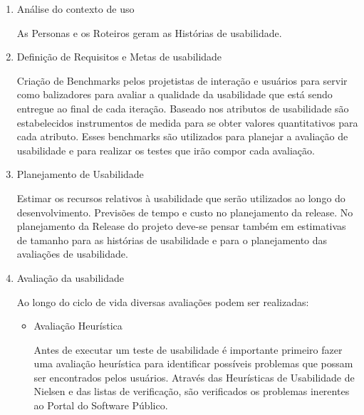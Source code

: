 \begin{enumerate}
\begin{itemize}
	\end{itemize}
			
		
\item Análise do contexto de uso

		As Personas e os Roteiros geram as Histórias de usabilidade.

\item Definição de Requisitos e Metas de usabilidade

	Criação de Benchmarks pelos projetistas de interação e usuários para servir como balizadores para avaliar a qualidade da usabilidade que está sendo entregue ao final de cada iteração.
	Baseado nos atributos de usabilidade são estabelecidos instrumentos de medida para se obter valores quantitativos 	para cada atributo.
	Esses benchmarks são utilizados para planejar a avaliação de usabilidade e para realizar os testes que irão compor cada avaliação. %
	
		
\item Planejamento de Usabilidade

	Estimar os recursos relativos à usabilidade que serão utilizados ao longo do desenvolvimento. Previsões de tempo e custo no planejamento da release.
	 No planejamento da Release do projeto deve-se pensar também em estimativas de tamanho para as histórias de usabilidade e para o planejamento das avaliações de usabilidade.


\item Avaliação da usabilidade

	Ao longo do ciclo de vida diversas avaliações podem ser realizadas:
	
		
	\begin{itemize}
		\item Avaliação Heurística
		
		Antes de executar um teste de usabilidade é importante primeiro fazer uma avaliação heurística para identificar possíveis problemas que possam ser encontrados pelos usuários. Através das Heurísticas de Usabilidade de Nielsen e das listas de verificação, são verificados os problemas inerentes ao Portal do Software Público.
		
	

\end{itemize}
\end{enumerate}
